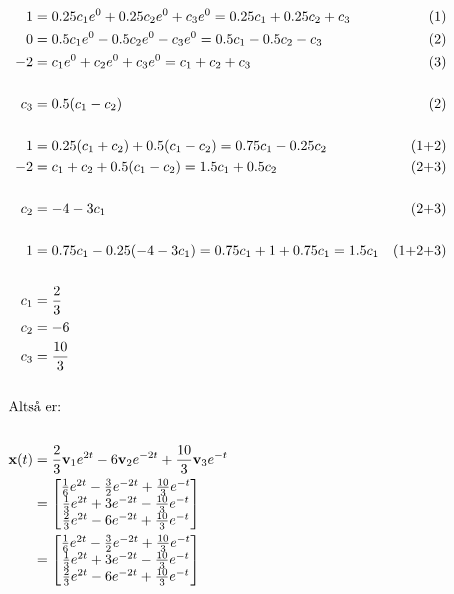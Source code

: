 \documentclass[a4paper, norsk, twoside, 10pt]{article}
\begin{document}
\begin{flushleft}
    \begin{align*}
    1 &= 0.25c_{1}e^{0} + 0.25c_{2}e^{0} + c_{3}e^{0} = 0.25c_{1} + 0.25c_{2} +c_{3} &\text{(1)}\\
    0 &= 0.5c_{1}e^{0} - 0.5c_{2}e^{0} - c_{3}e^{0} = 0.5c_{1} -0.5c_{2} - c_{3} & \text{(2)}\\
    -2 &=c_{1}e^{0} + c_{2}e^{0} + c_{3}e^{0} = c_{1} + c_{2} + c_{3} & \text{(3)}\\
    \ \\
    c_{3} &= 0.5(c_{1} - c_{2})  &\text{(2)}\\
    \ \\
    1 &= 0.25(c_{1} + c_{2}) + 0.5(c_{1} - c_{2}) = 0.75c_{1} -0.25c_{2} & \text{(1+2)}\\
    -2 &= c_{1} + c_{2} + 0.5(c_{1} - c_{2}) = 1.5 c_{1} + 0.5c_{2} & \text{(2+3)} \\
    \ \\
    c_{2} &= -4 -3c_{1} & \text{(2+3)} \\
    \ \\
    1 &= 0.75 c_{1} - 0.25(-4 -3c_{1}) = 0.75c_{1} + 1 + 0.75c_{1} = 1.5 c_{1} & \text{(1+2+3)}\\
    \ \\
    c_{1} &= \frac{2}{3} &\\
    c_{2} &= -6 &\\
    c_{3} &= \frac{10}{3} &\\
    \ \\
    \intertext{Altså er:} \\
    \mathbf{x}(t) &= \frac{2}{3}\mathbf{v}_{1}e^{2t} -6\mathbf{v}_{2}e^{-2t} + \frac{10}{3}\mathbf{v}_{3}e^{-t} \\
    &=
    \begin{bmatrix}
      \frac{1}{6}e^{2t} - \frac{3}{2}e^{-2t} + \frac{10}{3}e^{-t} \\
      \frac{1}{3}e^{2t} + 3e^{-2t} - \frac{10}{3}e^{-t} \\
      \frac{2}{3}e^{2t} - 6e^{-2t} + \frac{10}{3}e^{-t} \\
    \end{bmatrix} \\
    &=
    \begin{bmatrix}
      \frac{1}{6}e^{2t} - \frac{3}{2}e^{-2t} + \frac{10}{3}e^{-t} \\
      \frac{1}{3}e^{2t} + 3e^{-2t} - \frac{10}{3}e^{-t} \\
      \frac{2}{3}e^{2t} - 6e^{-2t} + \frac{10}{3}e^{-t} \\
    \end{bmatrix} \\
    \end{align*}
\end{flushleft}
\end{document}

